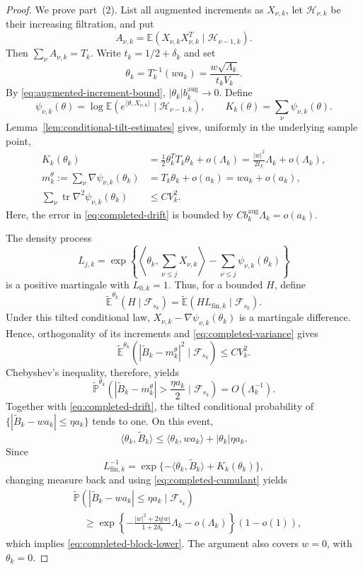 \documentclass[12pt, reqno, final, a4paper]{amsart}
\theoremstyle{plain}
\theoremstyle{definition}
\theoremstyle{remark}
\DeclareMathOperator{\tr}{tr}
\newcommand{\E}{\mathbb E}
\newcommand{\1}{\mathbf 1}
\begin{document}
\begin{proof}
We prove part~(2). List all augmented increments as $X_{\nu,k}$, let
$\mathcal H_{\nu,k}$ be their increasing filtration, and put
\[
 A_{\nu,k}=\E(X_{\nu,k}X_{\nu,k}^T\mid\mathcal H_{\nu-1,k}).
\]
Then $\sum_\nu A_{\nu,k}=T_k$. Write
$t_k=1/2+\delta_k$ and set
\[
 \theta_k=T_k^{-1}(wa_k)=\frac{w\sqrt{\Lambda_k}}{t_kV_k}.
\]
By \eqref{eq:augmented-increment-bound},
$|\theta_k|b_k^{\mathrm{aug}}\to0$. Define
\[
 \psi_{\nu,k}(\theta)=
 \log\E(e^{\langle\theta,X_{\nu,k}\rangle}
       \mid\mathcal H_{\nu-1,k}),
 \qquad
 K_k(\theta)=\sum_\nu\psi_{\nu,k}(\theta).
\]
Lemma~\ref{lem:conditional-tilt-estimates} gives, uniformly in the underlying
sample point,
\begin{align}
 K_k(\theta_k)
 &=\frac12\theta_k^TT_k\theta_k+o(\Lambda_k)
 =\frac{|w|^2}{2t_k}\Lambda_k+o(\Lambda_k),
 \label{eq:completed-cumulant}\\
 m_k^{\theta}:=\sum_\nu\nabla\psi_{\nu,k}(\theta_k)
 &=T_k\theta_k+o(a_k)=wa_k+o(a_k),
 \label{eq:completed-drift}\\
 \sum_\nu\tr\nabla^2\psi_{\nu,k}(\theta_k)&\le CV_k^2.
 \label{eq:completed-variance}
\end{align}
Here, the error in \eqref{eq:completed-drift} is bounded by
$Cb_k^{\mathrm{aug}}\Lambda_k=o(a_k)$.

The density process
\[
 L_{j,k}=\exp\left\{
 \left\langle\theta_k,\sum_{\nu\le j}X_{\nu,k}\right\rangle
 -\sum_{\nu\le j}\psi_{\nu,k}(\theta_k)
 \right\}
\]
is a positive martingale with $L_{0,k}=1$. Thus, for a bounded $H$, define
\[
 \widetilde{\mathbb E}^{\theta_k}
 (H\mid\mathcal F_{s_k})
 =\widetilde{\mathbb E}(HL_{\mathrm{fin},k}
   \mid\mathcal F_{s_k}).
\]
Under this tilted conditional law,
$X_{\nu,k}-\nabla\psi_{\nu,k}(\theta_k)$ is a martingale difference. Hence,
orthogonality of its increments and \eqref{eq:completed-variance} gives
\[
 \widetilde{\mathbb E}^{\theta_k}\left(
 \left|\widetilde B_k-m_k^{\theta}\right|^2
 \mid\mathcal F_{s_k}\right)\le CV_k^2.
\]
Chebyshev's inequality, therefore, yields
\[
 \widetilde{\mathbb P}^{\theta_k}\left(
 |\widetilde B_k-m_k^{\theta}|>\frac{\eta a_k}{2}
 \mid\mathcal F_{s_k}\right)=O(\Lambda_k^{-1}).
\]
Together with \eqref{eq:completed-drift}, the tilted conditional probability
of $\{|\widetilde B_k-wa_k|\le\eta a_k\}$ tends to one. On this event,
\[
 \langle\theta_k,\widetilde B_k\rangle
 \le\langle\theta_k,wa_k\rangle+|\theta_k|\eta a_k.
\]
Since
\[
 L_{\mathrm{fin},k}^{-1}
 =\exp\{-\langle\theta_k,\widetilde B_k\rangle
          +K_k(\theta_k)\},
\]
changing measure back and using \eqref{eq:completed-cumulant} yields
\begin{align*}
 &\widetilde{\mathbb P}\left(
 |\widetilde B_k-wa_k|\le\eta a_k\mid\mathcal F_{s_k}\right)\\
 &\quad\ge
 \exp\left\{-\frac{|w|^2+2\eta|w|}{1+2\delta_k}\Lambda_k
              -o(\Lambda_k)\right\}(1-o(1)),
\end{align*}
which implies \eqref{eq:completed-block-lower}. The argument also covers
$w=0$, with $\theta_k=0$.


\end{proof}
\end{document}
